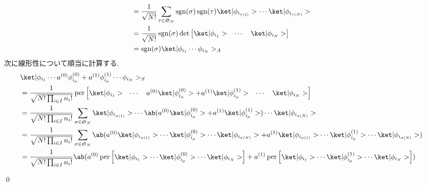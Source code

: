 \documentclass[uplatex,dvipdfmx,a4paper,11pt]{jlreq}
\makeatletter
\DeclareMathOperator{\sgn}{sgn}
\DeclareMathOperator{\per}{per}
\DeclareMathOperator{\Det}{det}
\renewcommand{\SS}{\mathfrak{S}}
\numberwithin{equation}{section}
\theoremstyle{definition}
\renewenvironment{proof}[1][\proofname]{\par
  \normalfont
  \topsep6\p@\@plus6\p@ \trivlist
  \item[\hskip\labelsep{\bfseries #1}\@addpunct{\bfseries}]\ignorespaces\quad\par
}{
  \qed\endtrivlist\@endpefalse
}
\renewcommand\proofname{証明}
\makeatother
\begin{document}
\begin{proof}
\begin{align}
                                                           & = \frac{1}{\sqrt{N!}}\sum_{\tau\in\SS_N}\sgn(\sigma)\sgn(\tau)\ket|\phi_{i_{\tau(1)}}>\cdots\ket|\phi_{i_{\tau(N)}}>                                    \\
                                                           & = \frac{1}{\sqrt{N!}}\sgn(\sigma)\Det\begin{bmatrix}\ket|\phi_{i_1}> & \cdots & \ket|\phi_{i_N}>\end{bmatrix}                                           \\
                                                           & = \sgn(\sigma)\ket|\phi_{i_1}\cdots\phi_{i_N}>_A
  \end{align}
  次に線形性について順当に計算する.
  \begin{align}
     & \ket|\phi_{i_1}\cdots a^{(0)}\phi_{i_\mu}^{(0)} + a^{(1)}\phi_{i_\mu}^{(1)}\cdots\phi_{i_N}>_S                                                                                                                                                                        \\
     & = \frac{1}{\sqrt{N!\prod_{i\in I}n_i!}}\per\begin{bmatrix}\ket|\phi_{i_1}> & \cdots & a^{(0)}\ket|\phi_{i_\mu}^{(0)}> + a^{(1)}\ket|\phi_{i_\mu}^{(1)}> & \cdots & \ket|\phi_{i_N}>\end{bmatrix}                                                                      \\
     & = \frac{1}{\sqrt{N!\prod_{i\in I}n_i!}}\sum_{\sigma\in\SS_N}\ket|\phi_{i_{\sigma(1)}}>\cdots\ab(a^{(0)}\ket|\phi_{i_\mu}^{(0)}> + a^{(1)}\ket|\phi_{i_\mu}^{(1)}>)\cdots\ket|\phi_{i_{\sigma(N)}}>                                                                    \\
     & = \frac{1}{\sqrt{N!\prod_{i\in I}n_i!}}\sum_{\sigma\in\SS_N}\ab(a^{(0)}\ket|\phi_{i_{\sigma(1)}}>\cdots\ket|\phi_{i_\mu}^{(0)}>\cdots\ket|\phi_{i_{\sigma(N)}}> + a^{(1)}\ket|\phi_{i_{\sigma(1)}}>\cdots\ket|\phi_{i_\mu}^{(1)}>\cdots\ket|\phi_{i_{\sigma(N)}}>)    \\
     & = \frac{1}{\sqrt{N!\prod_{i\in I}n_i!}}\ab(a^{(0)}\per\begin{bmatrix}\ket|\phi_{i_1}>\cdots\ket|\phi_{i_\mu}^{(0)}>\cdots\ket|\phi_{i_N}>\end{bmatrix} + a^{(1)}\per\begin{bmatrix}\ket|\phi_{i_1}>\cdots\ket|\phi_{i_\mu}^{(1)}>\cdots\ket|\phi_{i_N}>\end{bmatrix}) \\

\end{align}
\end{proof}
\end{document}
